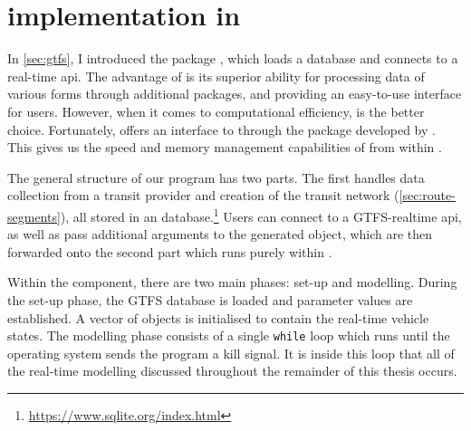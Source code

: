 

\section{\Rt{} implementation in }
\label{sec:rt-implementation}

In \cref{sec:gtfs}, I introduced the \Rstats{} package , which loads a \GTFS{} database and connects to a real-time \gls{api}. The advantage of \Rstats{} \citep{rcore} is its superior ability for processing data of various forms through additional packages, and providing an easy-to-use interface for users. However, when it comes to computational efficiency, \Cpp{} is the better choice. Fortunately, \Rstats{} offers an interface to \Cpp{} through the  package developed by \citet{Rcpp}. This gives us the speed and memory management capabilities of \Cpp{} from within \Rstats{}.

The general structure of our program has two parts. The first handles data collection from a transit provider and creation of the transit network (\cref{sec:route-segments}), all stored in an  database.\footnote{\url{https://www.sqlite.org/index.html}} Users can connect to a GTFS-realtime \gls{api}, as well as pass additional arguments to the generated  object, which are then forwarded onto the second part which runs purely within \Cpp{}.

Within the \Cpp{} component, there are two main phases: set-up and modelling. During the set-up phase, the GTFS database is loaded and parameter values are established. A vector of  objects is initialised to contain the real-time vehicle states. The modelling phase consists of a single \verb+while+ loop which runs until the operating system sends the program a kill signal. It is inside this loop that all of the real-time modelling discussed throughout the remainder of this thesis occurs.

